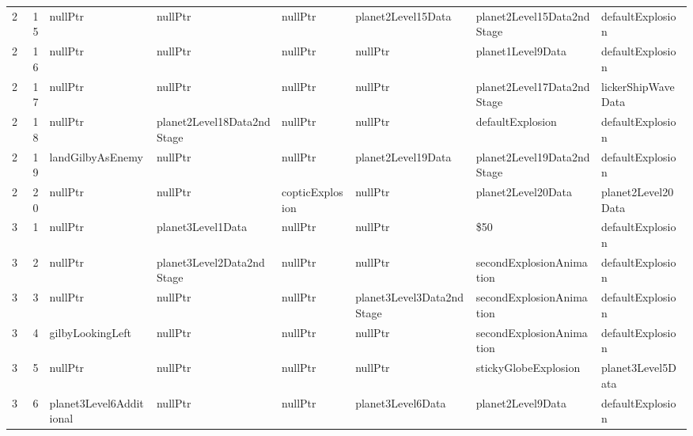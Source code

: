 \begin{tabular}{rrllllll}
      2 &      15 & nullPtr                  & nullPtr                      & nullPtr                      & planet2Level15Data        & planet2Level15Data2ndStage & defaultExplosion           \\
      2 &      16 & nullPtr                  & nullPtr                      & nullPtr                      & nullPtr                   & planet1Level9Data          & defaultExplosion           \\
      2 &      17 & nullPtr                  & nullPtr                      & nullPtr                      & nullPtr                   & planet2Level17Data2ndStage & lickerShipWaveData         \\
      2 &      18 & nullPtr                  & planet2Level18Data2ndStage   & nullPtr                      & nullPtr                   & defaultExplosion           & defaultExplosion           \\
      2 &      19 & landGilbyAsEnemy         & nullPtr                      & nullPtr                      & planet2Level19Data        & planet2Level19Data2ndStage & defaultExplosion           \\
      2 &      20 & nullPtr                  & nullPtr                      & copticExplosion              & nullPtr                   & planet2Level20Data         & planet2Level20Data         \\
      3 &       1 & nullPtr                  & planet3Level1Data            & nullPtr                      & nullPtr                   & \$50                        & defaultExplosion           \\
      3 &       2 & nullPtr                  & planet3Level2Data2ndStage    & nullPtr                      & nullPtr                   & secondExplosionAnimation   & defaultExplosion           \\
      3 &       3 & nullPtr                  & nullPtr                      & nullPtr                      & planet3Level3Data2ndStage & secondExplosionAnimation   & defaultExplosion           \\
      3 &       4 & gilbyLookingLeft         & nullPtr                      & nullPtr                      & nullPtr                   & secondExplosionAnimation   & defaultExplosion           \\
      3 &       5 & nullPtr                  & nullPtr                      & nullPtr                      & nullPtr                   & stickyGlobeExplosion       & planet3Level5Data          \\
      3 &       6 & planet3Level6Additional  & nullPtr                      & nullPtr                      & planet3Level6Data         & planet2Level9Data          & defaultExplosion           \\

\end{tabular}
